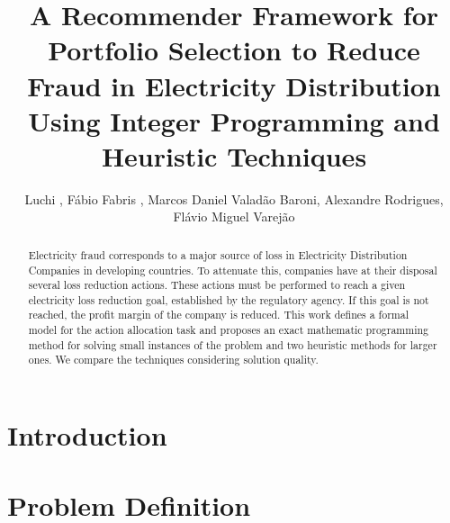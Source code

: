\documentclass{llncs}
\begin{document}
%
\title{A Recommender Framework for Portfolio Selection to Reduce
Fraud in Electricity Distribution Using Integer Programming and Heuristic Techniques}


\author{\Diego Luchi , 
F\'abio Fabris , 
Marcos Daniel Valad\~ao Baroni,
Alexandre Rodrigues,
Fl\'avio Miguel Varej\~ao
}


\maketitle

\begin{abstract}
Electricity fraud corresponds to a major source of loss in Electricity
Distribution Companies in developing countries. To attenuate this,
companies have at their disposal several loss reduction actions. These actions
must be performed to reach a given electricity loss reduction goal, established
by the regulatory agency. If this goal is not reached, the profit margin
of the company is reduced.
This work defines a formal model for the action allocation task 
and proposes an exact mathematic programming method for solving small instances of
the problem and two heuristic methods for larger ones. We compare
the techniques considering solution quality.

\end{abstract}


\section{Introduction}
\label{sec:intro}


\section{Problem Definition}
\label{sec:defi}

\end{document}
